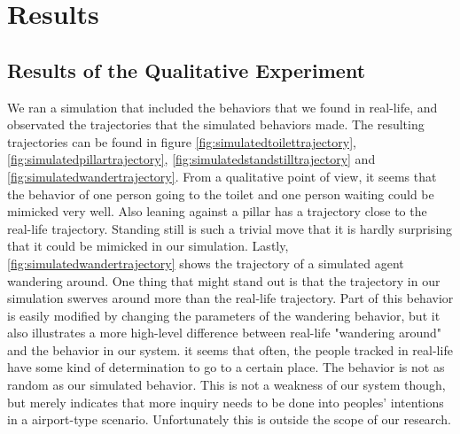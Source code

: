 \documentclass[11pt, a4paper]{book}
\begin{document}

\chapter{Results}
\label{chap:results}

\section{Results of the Qualitative Experiment}
\label{sec:qualitativeresults}

We ran a simulation that included the behaviors that we found in real-life, and observated the trajectories that the simulated behaviors made. The resulting trajectories can be found in figure \ref{fig:simulatedtoilettrajectory}, \ref{fig:simulatedpillartrajectory}, \ref{fig:simulatedstandstilltrajectory} and \ref{fig:simulatedwandertrajectory}. From a qualitative point of view, it seems that the behavior of one person going to the toilet and one person waiting could be mimicked very well. Also leaning against a pillar has a trajectory close to the real-life trajectory. Standing still is such a trivial move that it is hardly surprising that it could be mimicked in our simulation. Lastly, \ref{fig:simulatedwandertrajectory} shows the trajectory of a simulated agent wandering around. One thing that might stand out is that the trajectory in our simulation swerves around more than the real-life trajectory. Part of this behavior is easily modified by changing the parameters of the wandering behavior, but it also illustrates a more high-level difference between real-life "wandering around" and the behavior in our system. it seems that often, the people tracked in real-life have some kind of determination to go to a certain place. The behavior is not as random as our simulated behavior. This is not a weakness of our system though, but merely indicates that more inquiry needs to be done into peoples' intentions in a airport-type scenario. Unfortunately this is outside the scope of our research.
\end{document}
